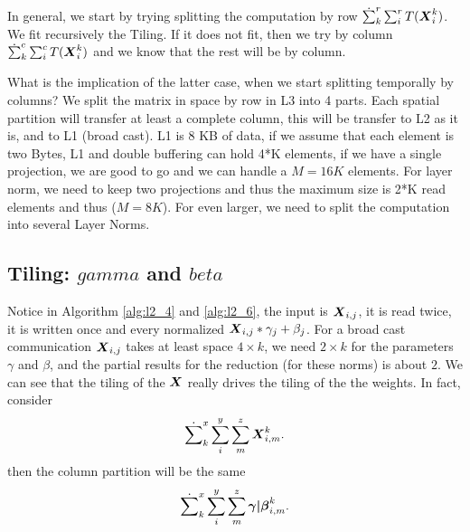 \documentclass[acmsmall]{acmart}
\begin{document}
In general, we start by trying splitting the computation by row
$\dot\sum_k^r\sum_{i}^r T({\boldsymbol X}^{k}_{i})$. We fit recursively the
Tiling. If it does not fit, then we try by column
$\dot\sum_k^c\sum_{i}^c T({\boldsymbol X}^{k}_{i})$ and we know that the rest
will be by column.


What is the implication of the latter case, when we start splitting
temporally by columns? We split the matrix in space by row in L3 into
4 parts. Each spatial partition will transfer at least a complete
column, this will be transfer to L2 as it is, and to L1 (broad cast).
L1 is 8 KB of data, if we assume that each element is two Bytes, L1
and double buffering can hold 4*K elements, if we have a single
projection, we are good to go and we can handle a $M=16K$ elements.
For layer norm, we need to keep two projections and thus the maximum
size is 2*K read elements and thus ($M = 8K$). For even larger, we
need to split the computation into several Layer Norms.

\subsection{Tiling: $gamma$ and $beta$ }
Notice in Algorithm \ref{alg:l2_4} and \ref{alg:l2_6}, the input is
${\boldsymbol X}_{i,j}$, it is read twice, it is written once and every
normalized ${\boldsymbol X}_{i,j}*\gamma_j + \beta_j$. For a broad cast
communication ${\boldsymbol X}_{i,j}$ takes at least space $4\times k$, we need
$2\times k$ for the parameters $\gamma$ and $\beta$, and the partial
results for the reduction (for these norms) is about $2$. We can see
that the tiling of the ${\boldsymbol X}$ really drives the tiling of the the
weights. In fact, consider
\begin{equation}
\dot\sum_k^x\sum_{i}^y\sum_{m}^z{\boldsymbol X}^{k}_{i,m}.
\end{equation}
then the column partition will be the same
\begin{equation}
  \dot\sum_k^x\sum_{i}^y\sum_{m}^z{\boldsymbol {\gamma|\beta}}^{k}_{i,m}.
\end{equation}
\end{document}
